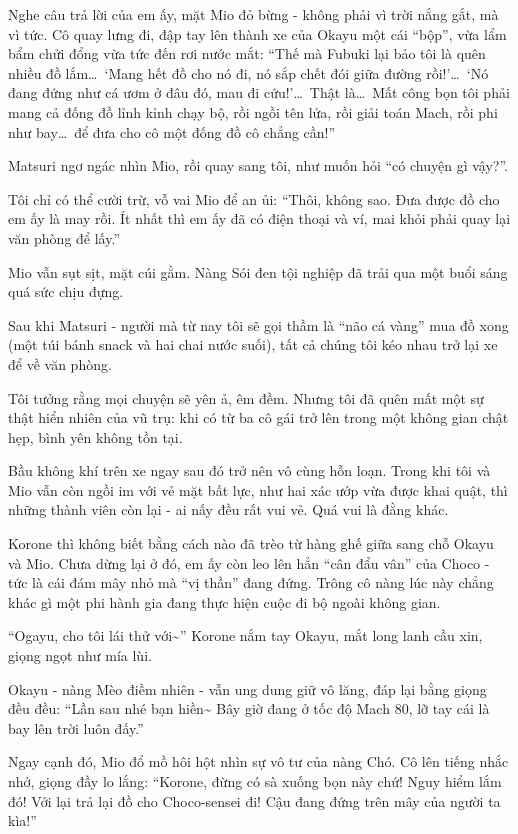 \documentclass[../main.tex]{subfiles}
\begin{document}
Nghe câu trả lời của em ấy, mặt Mio đỏ bừng - không phải vì trời nắng gắt, mà vì tức. Cô quay lưng đi, đập tay lên thành xe của Okayu một cái ``bộp'', vừa lẩm bẩm chửi đổng vừa tức đến rơi nước mắt: ``Thế mà Fubuki lại bảo tôi là quên nhiều đồ lắm\dots\ `Mang hết đồ cho nó đi, nó sắp chết đói giữa đường rồi!'\dots\ `Nó đang đứng như cá ươm ở đâu đó, mau đi cứu!'\dots\ Thật là\dots\ Mất công bọn tôi phải mang cả đống đồ lỉnh kỉnh chạy bộ, rồi ngồi tên lửa, rồi giải toán Mach, rồi phi như bay\dots\ để đưa cho cô một đống đồ cô chẳng cần!''

Matsuri ngơ ngác nhìn Mio, rồi quay sang tôi, như muốn hỏi ``có chuyện gì vậy?''.

Tôi chỉ có thể cười trừ, vỗ vai Mio để an ủi: ``Thôi, không sao. Đưa được đồ cho em ấy là may rồi. Ít nhất thì em ấy đã có điện thoại và ví, mai khỏi phải quay lại văn phòng để lấy.''

Mio vẫn sụt sịt, mặt cúi gằm. Nàng Sói đen tội nghiệp đã trải qua một buổi sáng quá sức chịu đựng.

\ct

Sau khi Matsuri - người mà từ nay tôi sẽ gọi thầm là ``não cá vàng'' mua đồ xong (một túi bánh snack và hai chai nước suối), tất cả chúng tôi kéo nhau trở lại xe để về văn phòng.

Tôi tưởng rằng mọi chuyện sẽ yên ả, êm đềm. Nhưng tôi đã quên mất một sự thật hiển nhiên của vũ trụ: khi có từ ba cô gái trở lên trong một không gian chật hẹp, bình yên không tồn tại.

Bầu không khí trên xe ngay sau đó trở nên vô cùng hỗn loạn. Trong khi tôi và Mio vẫn còn ngồi im với vẻ mặt bất lực, như hai xác ướp vừa được khai quật, thì những thành viên còn lại - ai nấy đều rất vui vẻ. Quá vui là đằng khác.


Korone thì không biết bằng cách nào đã trèo từ hàng ghế giữa sang chỗ Okayu và Mio. Chưa dừng lại ở đó, em ấy còn leo lên hẳn ``cân đẩu vân'' của Choco - tức là cái đám mây nhỏ mà ``vị thần'' đang đứng. Trông cô nàng lúc này chẳng khác gì một phi hành gia đang thực hiện cuộc đi bộ ngoài không gian.

``Ogayu, cho tôi lái thử với\~{}'' Korone nắm tay Okayu, mắt long lanh cầu xin, giọng ngọt như mía lùi.

Okayu - nàng Mèo điềm nhiên - vẫn ung dung giữ vô lăng, đáp lại bằng giọng đều đều: ``Lần sau nhé bạn hiền\~{} Bây giờ đang ở tốc độ Mach 80, lỡ tay cái là bay lên trời luôn đấy.''

Ngay cạnh đó, Mio đổ mồ hôi hột nhìn sự vô tư của nàng Chó. Cô lên tiếng nhắc nhở, giọng đầy lo lắng: ``Korone, đừng có sà xuống bọn này chứ! Nguy hiểm lắm đó! Với lại trả lại đồ cho Choco-sensei đi! Cậu đang đứng trên mây của người ta kìa!''
\end{document}
